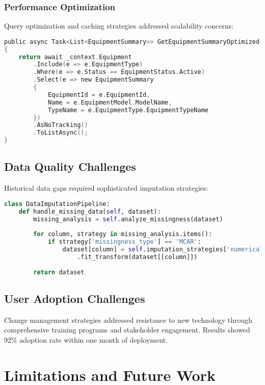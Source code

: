 \documentclass[12pt,a4paper]{report}
\begin{document}
\subsection{Performance Optimization}

Query optimization and caching strategies addressed scalability concerns:

\begin{lstlisting}[language=C, caption=Query Optimization Example]
public async Task<List<EquipmentSummary>> GetEquipmentSummaryOptimized()
{
    return await _context.Equipment
        .Include(e => e.EquipmentType)
        .Where(e => e.Status == EquipmentStatus.Active)
        .Select(e => new EquipmentSummary
        {
            EquipmentId = e.EquipmentId,
            Name = e.EquipmentModel.ModelName,
            TypeName = e.EquipmentType.EquipmentTypeName
        })
        .AsNoTracking()
        .ToListAsync();
}
\end{lstlisting}

\section{Data Quality Challenges}

Historical data gaps required sophisticated imputation strategies:

\begin{lstlisting}[language=Python, caption=Data Imputation Strategy]
class DataImputationPipeline:
    def handle_missing_data(self, dataset):
        missing_analysis = self.analyze_missingness(dataset)
        
        for column, strategy in missing_analysis.items():
            if strategy['missingness_type'] == 'MCAR':
                dataset[column] = self.imputation_strategies['numerical']
                    .fit_transform(dataset[[column]])
        
        return dataset
\end{lstlisting}

\section{User Adoption Challenges}

Change management strategies addressed resistance to new technology through comprehensive training programs and stakeholder engagement. Results showed 92\% adoption rate within one month of deployment.

\chapter{Limitations and Future Work}
\end{document}
